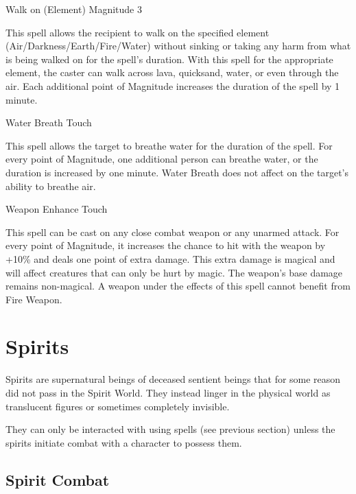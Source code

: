 \begin{rpg-spell}
{Walk on (Element)}
{Magnitude 3}

This spell allows the recipient to walk on the specified element (Air/Darkness/Earth/Fire/Water) without sinking or taking any harm from what is being walked on for the spell’s duration. With this spell for the appropriate element, the caster can walk across lava, quicksand, water, or even through the air. Each additional point of Magnitude increases the duration of the spell by 1 minute.
\end{rpg-spell}


\begin{rpg-spell}
{Water Breath}
{Touch}

This spell allows the target to breathe water for the duration of the spell. For every point of Magnitude, one additional person can breathe water, or the duration is increased by one minute. Water Breath does not affect on the target’s ability to breathe air.
\end{rpg-spell}


\begin{rpg-spell}
{Weapon Enhance}
{Touch}

This spell can be cast on any close combat weapon or any unarmed attack. For every point of Magnitude, it increases the chance to hit with the weapon by +10\% and deals one point of extra damage. This extra damage is magical and will affect creatures that can only be hurt by magic. The weapon’s base damage remains non-magical. A weapon under the effects of this spell cannot benefit from Fire Weapon.
\end{rpg-spell}


\section{Spirits}
Spirits are supernatural beings of deceased sentient beings that for some reason did not pass in the Spirit World. They instead linger in the physical world as translucent figures or sometimes completely invisible.

They can only be interacted with using spells (see previous section) unless the spirits initiate combat with a character to possess them.

\subsection{Spirit Combat}
\label{ssec:spirit-combat}


